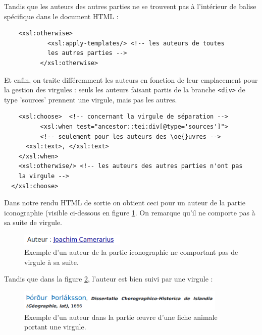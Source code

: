 \documentclass[a4paper,12pt,twoside]{book}
\begin{document}
    Tandis que les auteurs des autres parties ne se trouvent pas à l'intérieur de balise spécifique dans le document HTML :
    
    \begin{verbatim}
    <xsl:otherwise>
            <xsl:apply-templates/> <!-- les auteurs de toutes 
            les autres parties -->
          </xsl:otherwise>
    \end{verbatim}
    
    Et enfin, on traite différemment les auteurs en fonction de leur emplacement pour la gestion des virgules : seuls les auteurs faisant partis de la branche \texttt{<div>} de type 'sources' prennent une virgule, mais pas les autres.
    
    \begin{verbatim}
    <xsl:choose>  <!-- concernant la virgule de séparation -->
          <xsl:when test="ancestor::tei:div[@type='sources']">
          <!-- seulement pour les auteurs des \oe{}uvres -->
      <xsl:text>, </xsl:text>
    </xsl:when>
    <xsl:otherwise/> <!-- les auteurs des autres parties n'ont pas
    la virgule -->
  </xsl:choose>
    \end{verbatim}
    
    Dans notre rendu HTML de sortie on obtient ceci pour un auteur de la partie iconographie (visible ci-dessous en figure \ref{aut}. On remarque qu'il ne comporte pas à sa suite de virgule.
    
   \begin{figure}[H]
       \centering
       \includegraphics[width=5cm]{img/autre/auteur_icono.png}
       \caption{Exemple d'un auteur de la partie iconographie ne comportant pas de virgule à sa suite.}
       \label{aut}
   \end{figure}

    Tandis que dans la figure \ref{auteurvir}, l'auteur est bien suivi par une virgule :
    
    \begin{figure}[H]
        \centering
        \includegraphics[width=10cm]{img/autre/auteur_virgule.png}
        \caption{Exemple d'un auteur dans la partie \oe{}uvre d'une fiche animale portant une virgule.}
        \label{auteurvir}
    \end{figure}
    
\end{document}
